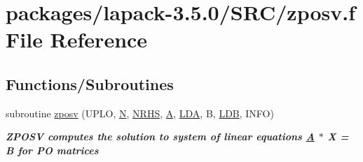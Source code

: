 \hypertarget{zposv_8f}{}\section{packages/lapack-\/3.5.0/\+S\+R\+C/zposv.f File Reference}
\label{zposv_8f}
\subsection*{Functions/\+Subroutines}
\begin{DoxyCompactItemize}
\item 
subroutine \hyperlink{group__complex16POsolve_ga58f7fd3a95eb2994b1caec327ec75895}{zposv} (U\+P\+L\+O, \hyperlink{polmisc_8c_a0240ac851181b84ac374872dc5434ee4}{N}, \hyperlink{example__user_8c_aa0138da002ce2a90360df2f521eb3198}{N\+R\+H\+S}, \hyperlink{classA}{A}, \hyperlink{example__user_8c_ae946da542ce0db94dced19b2ecefd1aa}{L\+D\+A}, B, \hyperlink{example__user_8c_a50e90a7104df172b5a89a06c47fcca04}{L\+D\+B}, I\+N\+F\+O)
\begin{DoxyCompactList}\small\item\em {\bfseries  Z\+P\+O\+S\+V computes the solution to system of linear equations \hyperlink{classA}{A} $\ast$ X = B for P\+O matrices} \end{DoxyCompactList}\end{DoxyCompactItemize}

